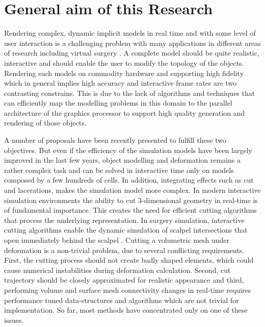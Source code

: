 

\label{chapter:introduction}
\section{General aim of this Research}
Rendering complex, dynamic implicit models in real time and with some level of user interaction is a challenging 
problem with many applications in different areas of research including virtual surgery \cite{France2002a}. 
A complete model should be quite realistic, interactive and should enable the user to modify the topology of the objects.
Rendering such models on commodity hardware and supporting high fidelity which in general implies high 
accuracy and interactive frame rates are two contrasting constrains. This is due 
to the lack of algorithms and techniques that can efficiently map the modelling problems in this domain to the 
parallel architecture of the graphics processor to support high quality generation and rendering of those objects. 

A number of proposals have been recently presented to fulfill these two objectives. But even if the efficiency
of the simulation models have been largely improved in the last few years, object modelling and deformation remains a rather 
complex task and can be solved in interactive time only on models composed by a few hundreds of cells. In addition, integrating effects
such as cut and lacerations, makes the simulation model more complex. In modern interactive simulation environments the ability to 
cut 3-dimensional geometry in real-time is of fundamental importance. This creates the need for efficient cutting algorithms that process the 
underlying representation. In surgery simulation, interactive cutting algorithms enable the dynamic simulation of scalpel intersections that open 
immediately behind the scalpel \cite{Nienhuys2001a}. Cutting a volumetric mesh under deformation is a non-trivial problem, 
due to several conflicting requirements. First, the cutting process should not create badly shaped elements, which could 
cause numerical instabilities during deformation calculation. Second, cut trajectory should be closely approximated 
for realistic appearance and third, performing volume and surface mesh connectivity changes in real-time 
requires performance tuned data-structures and algorithms which are not trivial for implementation. 
So far, most methods have concentrated only on one of these issues. 

